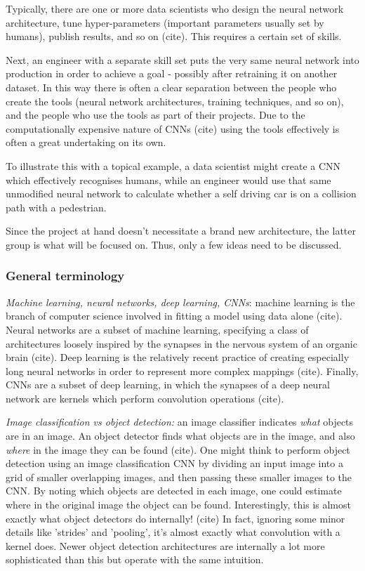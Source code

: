 Typically, there are one or more data scientists who design the neural network architecture, tune hyper-parameters (important parameters usually set by humans), publish results, and so on {\color{red} (cite)}. This requires a certain set of skills.

Next, an engineer with a separate skill set puts the very same neural network into production in order to achieve a goal - possibly after retraining it on another dataset. In this way there is often a clear separation between the people who create the tools (neural network architectures, training techniques, and so on), and the people who use the tools as part of their projects. Due to the computationally expensive nature of CNNs {\color{red} (cite)} using the tools effectively is often a great undertaking on its own.

To illustrate this with a topical example, a data scientist might create a CNN which effectively recognises humans, while an engineer would use that same unmodified neural network to calculate whether a self driving car is on a collision path with a pedestrian.

Since the project at hand doesn't necessitate a brand new architecture, the latter group is what will be focused on. Thus, only a few ideas need to be discussed.

\subsubsection{General terminology}

\textit{Machine learning, neural networks, deep learning, CNNs}: machine learning is the branch of computer science involved in fitting a model using data alone {\color{red} (cite)}. Neural networks are a subset of machine learning, specifying a class of architectures loosely inspired by the synapses in the nervous system of an organic brain {\color{red} (cite)}. Deep learning is the relatively recent practice of creating especially long neural networks in order to represent more complex mappings {\color{red} (cite)}. Finally, CNNs are a subset of deep learning, in which the synapses of a deep neural network are kernels which perform convolution operations {\color{red} (cite)}.

\textit{Image classification vs object detection:} an image classifier indicates \emph{what} objects are in an image. An object detector finds what objects are in the image, and also \emph{where} in the image they can be found {\color{red} (cite)}. One might think to perform object detection using an image classification CNN by dividing an input image into a grid of smaller overlapping images, and then passing these smaller images to the CNN. By noting which objects are detected in each image, one could estimate where in the original image the object can be found. Interestingly, this is almost exactly what object detectors do internally! {\color{red} (cite)} In fact, ignoring some minor details like 'strides' and 'pooling', it's almost exactly what convolution with a kernel does. Newer object detection architectures are internally a lot more sophisticated than this but operate with the same intuition.

